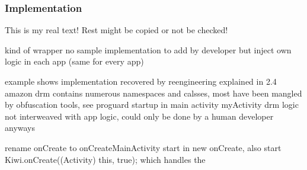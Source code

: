 \subsubsection{Implementation}\label{subsection:license-amazon-implementation}
This is my real text! Rest might be copied or not be checked!

%
kind of wrapper
no sample implementation to add by developer but inject own logic in each app (same for every app)

example shows implementation recovered by reengineering explained in 2.4
amazon drm contains numerous namespaces and calsses, most have been mangled by obfuscation tools, see proguard
startup in main activity myActivity
drm logic not interweaved with app logic, could only be done by a human developer anyways

\cite{munteanLicense}
%




rename onCreate to onCreateMainActivity
start in new onCreate, also start Kiwi.onCreate((Activity) this, true); which handles the
